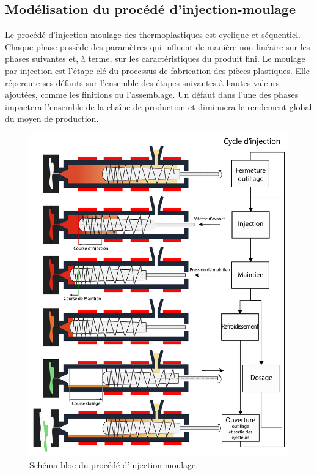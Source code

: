 \subsection{Modélisation du procédé d'injection-moulage}
Le procédé d'injection-moulage des thermoplastiques est cyclique et séquentiel.
Chaque phase possède des paramètres qui influent de manière non-linéaire sur les phases suivantes et, à terme, sur les caractéristiques du produit fini.
Le moulage par injection est l'étape clé du processus de fabrication des pièces plastiques.
Elle répercute ses défauts sur l'ensemble des étapes suivantes à hautes valeurs ajoutées, comme les finitions ou l'assemblage.
Un défaut dans l’une des phases impactera l’ensemble de la chaîne de production et diminuera le rendement global du moyen de production.

\begin{figure}[hbtp]
	\centering
	\includegraphics[width=\textwidth,height=\textheight,keepaspectratio]{../Chap1/Figures/SAPRISTI_Schema-cycle.pdf}
	\caption{Schéma-bloc du procédé d'injection-moulage.}
	\label{fig:cycle_injection}
\end{figure}

